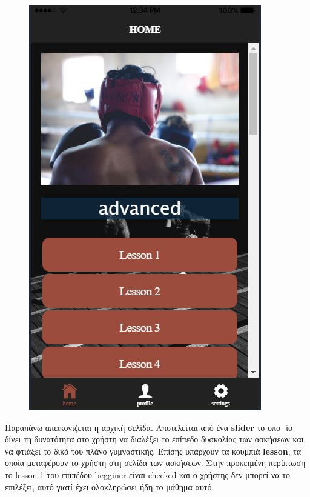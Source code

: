\documentclass[a4paper,12pt]{article}
\begin{document}
\begin{figure}[!htb]
				\endminipage\hfill
				  \includegraphics[width=\linewidth]{home3}
				  
				\endminipage
			\end{figure}

			\vspace*{1cm}


			Παραπάνω απεικονίζεται η αρχική σελίδα. Αποτελείται από ένα \textbf{slider} το οπο-
			ίο δίνει τη δυνατότητα στο χρήστη να διαλέξει 
			το επίπεδο δυσκολίας των ασκήσεων και να φτιάξει το δικό του πλάνο γυμναστικής. Επίσης υπάρχουν τα κουμπιά \textbf{lesson}, τα οποία μεταφέρουν το χρήστη στη σελίδα των ασκήσεων. Στην 
			προκειμένη περίπτωση το lesson 1 του επιπέδου begginer είναι checked και ο χρήστης δεν μπορεί να το επιλέξει, αυτό γιατί έχει 
			ολοκληρώσει ήδη το μάθημα αυτό. 
\end{document}
